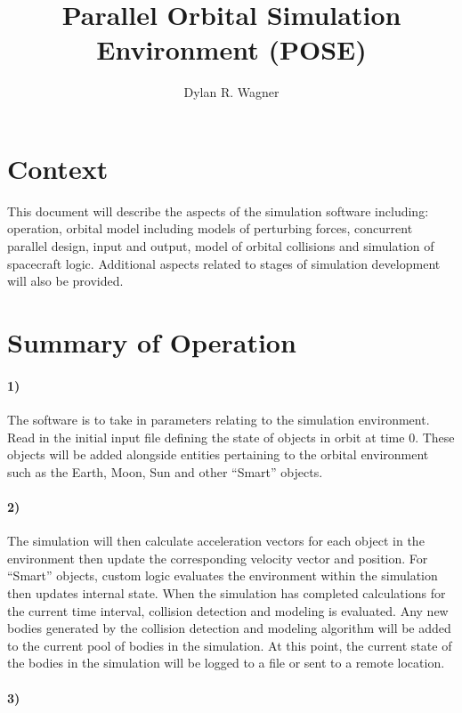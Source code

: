 \documentclass{article}
\title{Parallel Orbital Simulation Environment (POSE)}
\author{Dylan R. Wagner}
\begin{document}
  \maketitle
  
  \section{Context}
  
  This document will describe the aspects of the simulation software including: operation, orbital model including models of perturbing forces, concurrent parallel design, input and output, model of orbital collisions and simulation of spacecraft logic. Additional aspects related to stages of simulation development will also be provided.
  
  \section{Summary of Operation}
  
  \paragraph{1)}
  
  The software is to take in parameters relating to the simulation environment. Read in the initial input file defining the state of objects in orbit at time 0. These objects will be added alongside entities pertaining to the orbital environment such as the Earth, Moon, Sun and other “Smart” objects. 
  
  \paragraph{2)}
  
  The simulation will then calculate acceleration vectors for each object in the environment then update the corresponding velocity vector and position. For “Smart” objects, custom logic evaluates the environment within the simulation then updates internal state. When the simulation has completed calculations for the current time interval, collision detection and modeling is evaluated. Any new bodies generated by the collision detection and modeling algorithm will be added to the current pool of bodies in the simulation. At this point, the current state of the bodies in the simulation will be logged to a file or sent to a remote location. 
  
  \paragraph{3)}
  
\end{document}
